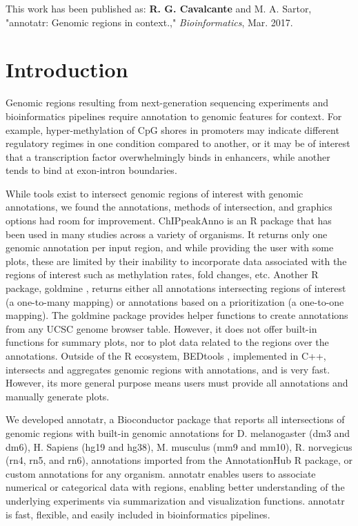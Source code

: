 \noindent This work has been published as: \textbf{R. G. Cavalcante} and M. A. Sartor, "annotatr: Genomic regions in context.," \emph{Bioinformatics}, Mar. 2017.

\section{Introduction}
\label{annotatr_introduction}

Genomic regions resulting from next-generation sequencing experiments and bioinformatics pipelines require annotation to genomic features for context. For example, hyper-methylation of CpG shores in promoters may indicate different regulatory regimes in one condition compared to another, or it may be of interest that a transcription factor overwhelmingly binds in enhancers, while another tends to bind at exon-intron boundaries.

While tools exist to intersect genomic regions of interest with genomic annotations, we found the annotations, methods of intersection, and graphics options had room for improvement. ChIPpeakAnno \cite{Zhu:2010be} is an R package that has been used in many studies across a variety of organisms. It returns only one genomic annotation per input region, and while providing the user with some plots, these are limited by their inability to incorporate data associated with the regions of interest such as methylation rates, fold changes, etc. Another R package, goldmine \cite{Bhasin:2016bk}, returns either all annotations intersecting regions of interest (a one-to-many mapping) or annotations based on a prioritization (a one-to-one mapping). The goldmine package provides helper functions to create annotations from any UCSC genome browser table. However, it does not offer built-in functions for summary plots, nor to plot data related to the regions over the annotations. Outside of the R ecosystem, BEDtools \cite{Quinlan:2010km}, implemented in C++, intersects and aggregates genomic regions with annotations, and is very fast. However, its more general purpose means users must provide all annotations and manually generate plots.

We developed annotatr, a Bioconductor package that reports all intersections of genomic regions with built-in genomic annotations for D. melanogaster (dm3 and dm6), H. Sapiens (hg19 and hg38), M. musculus (mm9 and mm10), R. norvegicus (rn4, rn5, and rn6), annotations imported from the AnnotationHub R package, or custom annotations for any organism. annotatr enables users to associate numerical or categorical data with regions, enabling better understanding of the underlying experiments via summarization and visualization functions. annotatr is fast, flexible, and easily included in bioinformatics pipelines.

